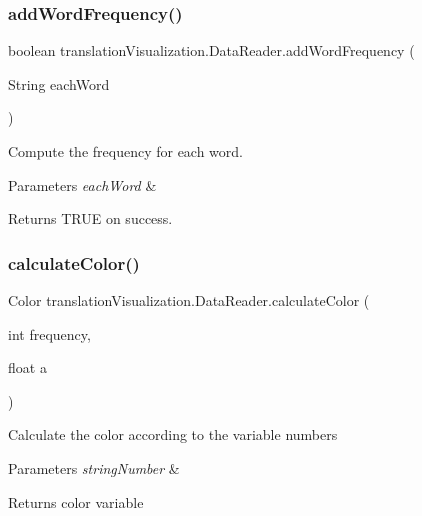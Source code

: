 \subsubsection{\texorpdfstring{add\+Word\+Frequency()}{addWordFrequency()}}
{\footnotesize\ttfamily boolean translation\+Visualization.\+Data\+Reader.\+add\+Word\+Frequency (\begin{DoxyParamCaption}\item[{String}]{each\+Word }\end{DoxyParamCaption})\hspace{0.3cm}{\ttfamily [inline]}}

Compute the frequency for each word. 
\begin{DoxyParams}{Parameters}
{\em each\+Word} & \\
\hline
\end{DoxyParams}
\begin{DoxyReturn}{Returns}
T\+R\+UE on success. 
\end{DoxyReturn}
\mbox{\label{classtranslation_visualization_1_1_data_reader_af6396c7c658d44859ab2e7b9a52d9230}} 
\subsubsection{\texorpdfstring{calculate\+Color()}{calculateColor()}}
{\footnotesize\ttfamily Color translation\+Visualization.\+Data\+Reader.\+calculate\+Color (\begin{DoxyParamCaption}\item[{int}]{frequency,  }\item[{float}]{a }\end{DoxyParamCaption})\hspace{0.3cm}{\ttfamily [inline]}}

Calculate the color according to the variable numbers 
\begin{DoxyParams}{Parameters}
{\em string\+Number} & \\
\hline
\end{DoxyParams}
\begin{DoxyReturn}{Returns}
color variable 
\end{DoxyReturn}
\mbox{\label{classtranslation_visualization_1_1_data_reader_a54d1cf51ae6bb37c002422aa53a10811}} 
